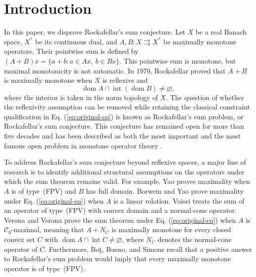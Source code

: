 \documentclass[11pt]{article}
\newcommand{\dom}{\operatorname{dom}}
\theoremstyle{definition}
\theoremstyle{remark}
\begin{document}
\section{Introduction}
\label{sec:introduction}
In this paper, we disprove Rockafellar's sum conjecture. 
Let $X$ be a real Banach space, $X^*$ be its continuous dual, and $A,B:X\rightrightarrows X^*$ be maximally monotone operators. Their pointwise sum is defined by $(A+B)x=\{a+b:a\in Ax,\ b\in Bx\}$. This pointwise sum is monotone, but maximal monotonicity is not automatic.  
In 1970, Rockafellar \cite{rockafellar1970} proved that $A+B$ is maximally monotone when $X$ is reflexive and
\begin{equation}
\dom A\cap\operatorname{int}(\dom B)\ne\varnothing,
\label{eq:original-cq}
\end{equation}
where the interior is taken in the norm topology of $X$. 
The question of whether the reflexivity assumption can be removed while retaining the classical constraint qualification in Eq. (\ref{eq:original-cq}) is known as Rockafellar's sum problem, or Rockafellar's sum conjecture. This conjecture has remained open for more than five decades and has been described as both the most important and the most famous open problem in monotone operator theory \cite{yao2010,borweinyao2012}. 









To address Rockafellar's sum conjecture beyond reflexive spaces, a major line of research is to identify additional structural assumptions on the operators under which the sum theorem remains valid. 
For example, Yao \cite{yao2010} proves maximality when $A$ is of type~(FPV) and $B$ has full domain. Borwein and Yao \cite{borweinyao2012} prove maximality under Eq. (\ref{eq:original-cq}) when $A$ is a linear relation. Voisei \cite{voisei2010} treats the sum of an operator of type~(FPV) with convex domain and a normal-cone operator. Verona and Verona \cite{veronaverona2022} prove the sum theorem under Eq. (\ref{eq:original-cq}) when $A$ is $\mathcal C_0$-maximal, meaning that  $A+N_C$ is maximally monotone for every closed convex set $C$ with $\dom A\cap\operatorname{int}C\ne\varnothing$, where $N_C$ denotes the normal-cone operator of $C$. 
Furthermore, Bo\c{t}, Bueno, and Simons \cite{botbuenosimons2016} recall that a positive answer to Rockafellar's sum problem would imply that every maximally monotone operator is of type~(FPV). 
\end{document}
